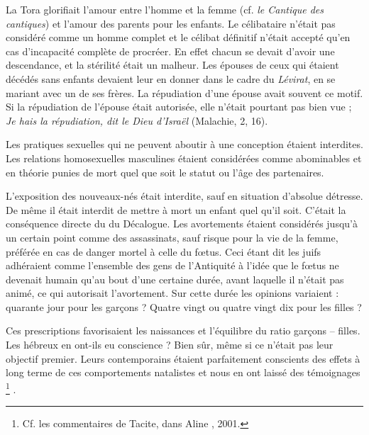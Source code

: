  La Tora glorifiait l'amour entre l'homme et la femme (cf. \emph{le Cantique des cantiques}) et l'amour des parents pour les enfants. Le célibataire n'était pas considéré comme un homme complet et le célibat définitif n'était accepté qu'en cas d'incapacité complète de procréer. En effet chacun se devait d'avoir une descendance, et la stérilité était un malheur. Les épouses de ceux qui étaient décédés sans enfants devaient leur en donner dans le cadre du \emph{Lévirat}, en se mariant avec un de ses frères. La répudiation d'une épouse avait souvent ce motif. Si la répudiation de l'épouse était autorisée, elle n'était pourtant pas bien vue ; \emph{Je hais la répudiation, dit le Dieu d'Israël} (Malachie, 2, 16).

 Les pratiques sexuelles qui ne peuvent aboutir à une conception étaient interdites. Les relations homosexuelles masculines étaient considérées comme abominables et en théorie punies de mort quel que soit le statut ou l'âge des partenaires. 

 L'exposition des nouveaux-nés était interdite, sauf en situation d'absolue détresse. De même il était interdit de mettre à mort un enfant quel qu'il soit. C'était la conséquence directe du  du Décalogue. Les avortements étaient considérés jusqu'à un certain point comme des assassinats, sauf risque pour la vie de la femme, préférée en cas de danger mortel à celle du fœtus. Ceci étant dit les juifs adhéraient comme l'ensemble des gens de l'Antiquité à l'idée que le fœtus ne devenait humain qu'au bout d'une certaine durée, avant laquelle il n'était pas animé, ce qui autorisait l'avortement. Sur cette durée les opinions variaient : quarante jour pour les garçons ? Quatre vingt ou quatre vingt dix pour les filles ? 

 Ces prescriptions favorisaient les naissances et l'équilibre du ratio garçons -- filles. Les hébreux en ont-ils eu conscience ? Bien sûr, même si ce n'était pas leur objectif premier. Leurs contemporains étaient parfaitement conscients des effets à long terme de ces comportements natalistes et nous en ont laissé des témoignages%
\footnote{Cf. les commentaires de Tacite, dans Aline , 2001.}%
.

